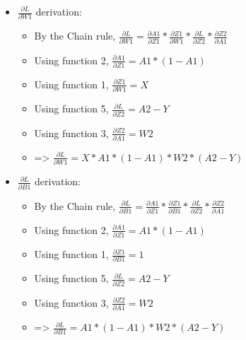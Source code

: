 \documentclass[10pt,a4paper]{article}
\begin{document}
\begin{itemize}
    \item $$ derivation:
    \begin{itemize}
        \item By the Chain rule, $ =  *  *  * $
        \item Using function 2, $ = A1 * (1-A1)$
        \item Using function 1, $ = X$
        \item Using function 5, $ = A2 - Y$
        \item Using function 3, $ = W2$
        \item => $ = X * A1 * (1-A1) * W2 * (A2-Y)$
    \end{itemize}
    \item $$ derivation:
    \begin{itemize}
        \item By the Chain rule, $ =  *  *  * $
        \item Using function 2, $ = A1 * (1-A1)$
        \item Using function 1, $ = 1$
        \item Using function 5, $ = A2 - Y$
        \item Using function 3, $ = W2$
        \item => $ = A1 * (1-A1) * W2 * (A2-Y)$
    \end{itemize}
\end{itemize}
\end{document}
